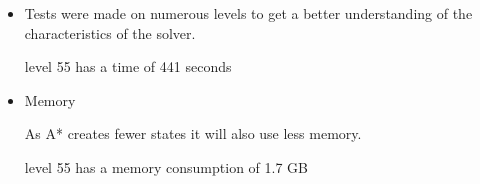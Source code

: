 \documentclass[../../maint.tex]{subfiles}
\begin{document}
\begin{itemize}
	
	
 	\begin{itemize}
 		\item
 		
 		Tests were made on numerous levels to get a better understanding of the characteristics of the solver.
 		
 		level 55 has a time of 441 seconds
 		
		\item Memory
		
		As A* creates fewer states it will also use less memory. 
		
		level 55 has a memory consumption of 1.7 GB
		
 	\end{itemize}
\end{itemize}
	
\end{document}
